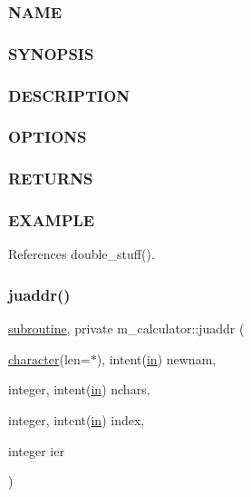 \subsubsection*{N\+A\+ME}

\subsubsection*{S\+Y\+N\+O\+P\+S\+IS}

\subsubsection*{D\+E\+S\+C\+R\+I\+P\+T\+I\+ON}

\subsubsection*{O\+P\+T\+I\+O\+NS}

\subsubsection*{R\+E\+T\+U\+R\+NS}

\subsubsection*{E\+X\+A\+M\+P\+LE}

References double\+\_\+stuff().

\mbox{\label{namespacem__calculator_a9306409f00c5ba6200bb68ca672b6053}} 
\subsubsection{\texorpdfstring{juaddr()}{juaddr()}}
{\footnotesize\ttfamily \hyperlink{M__stopwatch_83_8txt_acfbcff50169d691ff02d4a123ed70482}{subroutine}, private m\+\_\+calculator\+::juaddr (\begin{DoxyParamCaption}\item[{\hyperlink{option__stopwatch_83_8txt_abd4b21fbbd175834027b5224bfe97e66}{character}(len=$\ast$), intent(\hyperlink{M__journal_83_8txt_afce72651d1eed785a2132bee863b2f38}{in})}]{newnam,  }\item[{integer, intent(\hyperlink{M__journal_83_8txt_afce72651d1eed785a2132bee863b2f38}{in})}]{nchars,  }\item[{integer, intent(\hyperlink{M__journal_83_8txt_afce72651d1eed785a2132bee863b2f38}{in})}]{index,  }\item[{integer}]{ier }\end{DoxyParamCaption})\hspace{0.3cm}{\ttfamily [private]}}



